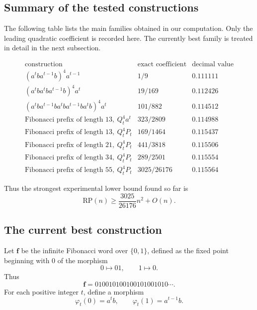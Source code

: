 \documentclass[runningheads,envcountsame,a4paper]{llncs}
\newcommand{\rp}{\mathrm{RP}}
\begin{document}
\subsection{Summary of the tested constructions}

The following table lists the main families obtained in our computation. Only the leading quadratic coefficient is recorded here. The currently best family is treated in detail in the next subsection.

\[
\begin{array}{c|c|c}
\text{construction} & \text{exact coefficient} & \text{decimal value}\\
\hline 
(a^tba^{t-1}b)^4a^{t-1}
    & 1/9
    & 0.111111\\[1mm]

(a^tba^tba^{t-1}b)^4a^t
    & 19/169
    & 0.112426\\[1mm]

(a^tba^{t-1}ba^tba^{t-1}ba^tb)^4a^t
    & 101/882
    & 0.114512\\[1mm]

\text{Fibonacci prefix of length }13,\ Q_t^4a^t
    & 323/2809
    & 0.114988\\[1mm]

\text{Fibonacci prefix of length }13,\ Q_t^4P_t
    & 169/1464
    & 0.115437\\[1mm]

\text{Fibonacci prefix of length }21,\ Q_t^4P_t
    & 441/3818
    & 0.115506\\[1mm]

\text{Fibonacci prefix of length }34,\ Q_t^4P_t
    & 289/2501
    & 0.115554\\[1mm]

\text{Fibonacci prefix of length }55,\ Q_t^4P_t
    & 3025/26176
    & 0.115564
\end{array}
\]

Thus the strongest experimental lower bound found so far is
\[
    \rp(n)\ge\frac{3025}{26176}n^2+O(n).
\]

\subsection{The current best construction}

Let $\mathbf f$ be the infinite Fibonacci word over $\{0,1\}$, defined as
the fixed point beginning with $0$ of the morphism
\[
    0\mapsto 01,\qquad 1\mapsto 0.
\]
Thus
\[
    \mathbf f=010010100100101001010\cdots .
\]
For each positive integer $t$, define a morphism
\[
    \varphi_t(0)=a^tb,\qquad
    \varphi_t(1)=a^{t-1}b.
\]
\end{document}
